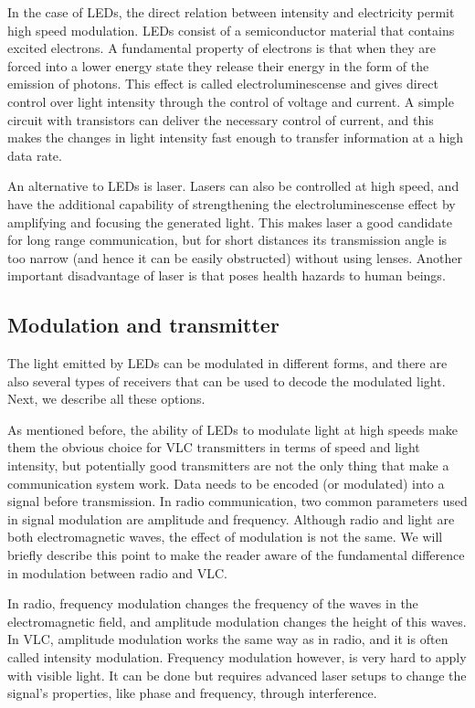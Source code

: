 In the case of LEDs, the direct relation between intensity and electricity permit
high speed modulation. LEDs consist of a semiconductor material that contains
excited electrons. A fundamental property of electrons is that when they are
forced into a lower energy state they release their energy in the form of the emission
of photons. This effect is called electroluminescense and gives direct control
over light intensity through the control of voltage and current. A simple circuit
with transistors can deliver the necessary control of current, and this makes the
changes in light intensity fast enough to transfer information at a high data rate.

An alternative to LEDs is laser. Lasers can also be controlled at high speed, and
have the additional capability of strengthening the electroluminescense effect by
amplifying and focusing the generated light. This makes laser a good candidate
for long range communication, but for short distances its transmission angle is too
narrow (and hence it can be easily obstructed) without using lenses. Another
important disadvantage of laser is that poses health hazards to human beings.

\subsection{Modulation and transmitter}

The light emitted by LEDs can be modulated in different forms, and there are also
several types of receivers that can be used to decode the modulated light. Next,
we describe all these options.

As mentioned before, the ability of LEDs to modulate light at high speeds make
them the obvious choice for VLC transmitters in terms of speed and light intensity,
but potentially good transmitters are not the only thing that make a communication
system work. Data needs to be encoded (or modulated) into a signal before
transmission.
In radio communication, two common parameters used in signal modulation
are amplitude and frequency. Although radio and light are both electromagnetic
waves, the effect of modulation is not the same. We will briefly describe this point
to make the reader aware of the fundamental difference in modulation between
radio and VLC.

In radio, frequency modulation changes the frequency of the waves in the electromagnetic
field, and amplitude modulation changes the height of this waves.
In VLC, amplitude modulation works the same way as in radio, and it is often
called intensity modulation. Frequency modulation however, is very hard to apply
with visible light. It can be done but requires advanced laser setups to change
the signal’s properties, like phase and frequency, through interference.

